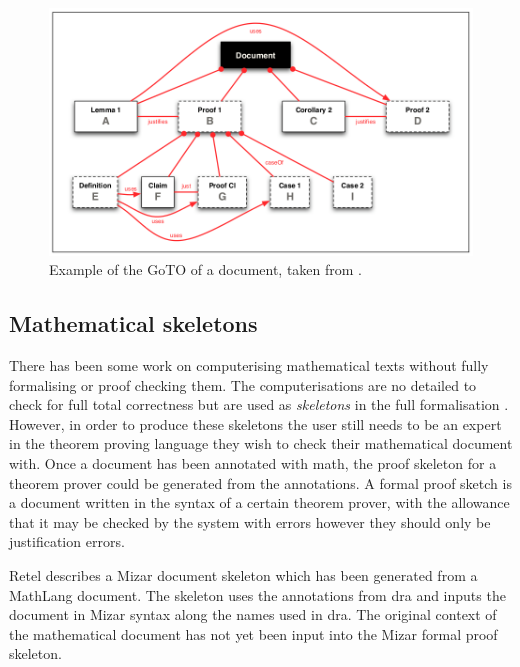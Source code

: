 \begin{figure}[H]
\begin{center}
\includegraphics[scale=0.45]{Figures/Background/pygograph.png}
\end{center}
\caption{Example of the GoTO of a document, taken from \cite{zengfirstyear}. \label{fig:pygograph}}
\end{figure}

\subsection{Mathematical skeletons}

There has been some work on computerising mathematical texts without fully
formalising or proof checking them. The computerisations are no detailed to
check for full total correctness but are used as \emph{skeletons} in the full
formalisation \cite{Wiedijk02formalproof}. However, in order to produce these
skeletons the user still  needs to be an expert in the theorem proving language
they wish to check their mathematical document with. Once a document has been
annotated with \gls{math}, the proof skeleton for a theorem prover could be
generated from the annotations. A formal proof sketch is a document written in
the syntax of a certain theorem prover, with the allowance that it may be
checked by the system with errors however they should only be justification
errors.

Retel \cite{krzysztofphd} describes a Mizar document skeleton which has been
generated from a MathLang document. The skeleton uses the annotations from
\gls{dra} and inputs the document in Mizar syntax along the names used in
\gls{dra}. The original context of the mathematical document has not yet been
input into the Mizar formal proof skeleton.

